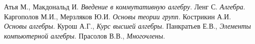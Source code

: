 \documentclass[12pt, titlepage, oneside]{amsbook}
\theoremstyle{definition}
\theoremstyle{remark}
\begin{document}
\begin{thebibliography}{lll}
	Атья М., Макдональд И. \emph{Введение в коммутативную алгебру}.
	Ленг С. \emph{Алгебра}.
	Каргополов М.И., Мерзляков Ю.И. \emph{Основы теории групп}.
	Кострикин А.И. \emph{Основы алгебры}.
	Курош А.Г., \emph{Курс высшей алгебры}.
	Панкратьев Е.В., \emph{Элементы компьютерной алгебры}.
	Прасолов В.В., \emph{Многочлены}.
\end{thebibliography}
\end{document}
